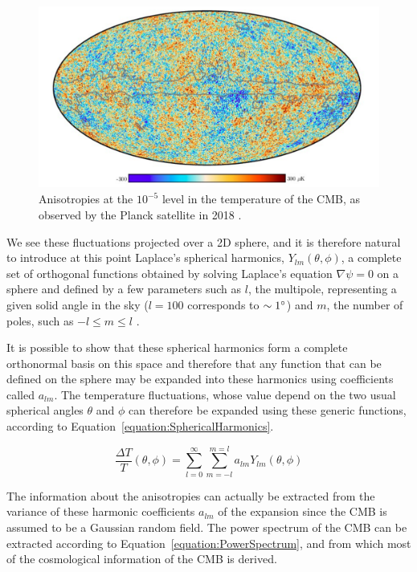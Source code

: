 \documentclass[a4paper, 10pt, openright]{report}
\begin{document}
\begin{figure}[htbp]
\begin{center}
\includegraphics[width=14cm, height=6cm]{figs/PlanckTemperature.png}
\caption{Anisotropies at the $10^{-5}$ level in the temperature of the \ac{CMB}, as observed by the Planck satellite in 2018 \cite{PlanckTemperature}.}
\label{figure:PlanckTemperature}
\end{center}
\end{figure}


We see these fluctuations projected over a 2D sphere, and it is therefore natural to introduce at this point Laplace's spherical harmonics, $Y_{lm} (\theta, \phi)$, a complete set of orthogonal functions obtained by solving Laplace's equation $\nabla \psi = 0$ on a sphere and defined by a few parameters such as $l$, the multipole, representing a given solid angle in the sky ($l=100$ corresponds to $\sim 1\degree$) and $m$, the number of poles, such as $-l \leq m \leq l$ \cite{PowerSpectrum}. 

It is possible to show that these spherical harmonics form a complete orthonormal basis on this space and therefore that any function that can be defined on the sphere may be expanded into these harmonics using coefficients called $a_{lm}$. The temperature fluctuations, whose value depend on the two usual spherical angles $\theta$ and $\phi$ can therefore be expanded using these generic functions, according to Equation~\ref{equation:SphericalHarmonics}.

\begin{equation} \label{equation:SphericalHarmonics}
\frac{\Delta T}{T}(\theta, \phi) = \sum_{l=0}^{\infty} \sum_{m=-l}^{m=l} a_{lm} Y_{lm} (\theta, \phi)
\end{equation}

The information about the anisotropies can actually be extracted from the variance of these harmonic coefficients $a_{lm}$ of the expansion since the \ac{CMB} is assumed to be a Gaussian random field. The power spectrum of the \ac{CMB} can be extracted according to Equation~\ref{equation:PowerSpectrum}, and from which most of the cosmological information of the \ac{CMB} is derived.
\end{document}

